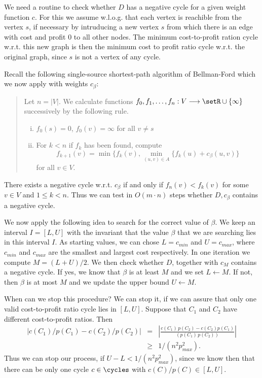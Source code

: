 We need a routine to check whether $D$ has a negative cycle for a
given weight function $c$. For this we assume w.l.o.g. that each 
vertex is reachible from the vertex $s$, if necessary by intruducing a
new vertex $s$ from which there is an edge with cost and profit $0$ to
all other nodes. The minimum cost-to-profit ration cycle w.r.t. this
new graph is then the minimum cost to profit ratio cycle w.r.t. the
original graph, since $s$ is not a vertex of any cycle. 

Recall the following single-source shortest-path algorithm  of
Bellman-Ford which we now apply with weights $c_\beta$: 


{\small
  \begin{quote}
    Let $n=|V|$. We calculate functions $f_0,f_1,\ldots,f_n:V\longrightarrow\setR\cup\{\infty\}$
    successively by the following rule. 
    
    \begin{enumerate}[i)]
    \item $f_0(s) = 0$, $f_0(v) = \infty$ for all $v \neq s$ 
    \item For $k<n$ if $f_k$ has been found, compute 
      \begin{displaymath}
        \displaystyle f_{k+1}(v) = \min\{f_k(v), \min_{(u,v)\in A}\{f_k(u)+c_\beta(u,v)\}  
      \end{displaymath}
      for all $v \in V$. 
    \end{enumerate}
  \end{quote}
}

There exists a negative cycle w.r.t. $c_\beta$ if and only if $f_n(v) <
f_k(v)$  for some $v \in V$ and $1\leq k<n$. Thus we can test in
$O(m\cdot n)$ steps whether $D,c_\beta$ contains a negative cycle. 

We now apply the following idea to  search for the correct value of
$\beta$. We keep an interval $I = [L,U]$ with the invariant that the
value  $\beta$ that we are searching lies in this interval $I$. As
starting values, we can chose $L = c_{min}$ and $U = c_{max}$, 
where $c_{min}$ and $c_{max}$ are the smallest and largest cost
respectively. In one iteration we compute $M = (L + U) /2$. We then
check whether $D$, together with $c_M$ contains a negative cycle. If
yes, we know that $\beta$ is at least $M$ and we set $L\gets M$. If not, then
$\beta$ is at most $M$ and we update the upper bound $U \gets M$. 

When can we stop this procedure? We can stop it, if we can assure that
only one valid cost-to-profit ratio cycle  lies in $[L,U]$. Suppose that $C_1$
and $C_2$ have different cost-to-profit ratios. Then 
\begin{eqnarray}
 | c(C_1) /  p(C_1) - c(C_2)/ p(C_2) | & = & \left| \frac{c(C_1)\, p(C_2) -
 c(C_2)p(C_1)}{  (p(C_1) \, p(C_2))}\right| \\
                                & \geq & 1/ (n^2 p_{max}^2). 
\end{eqnarray}
%
Thus we can stop our process, if $U-L< 1/ (n^2 p_{max}^2)$, since we
know then that there can be only one cycle $c \in \cycles$ with
$c(C)/p(C) \in [L,U]$.

